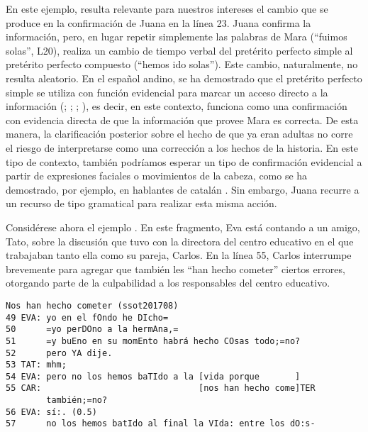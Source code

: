 \documentclass[output=paper]{../langscibook}
\begin{document}
En este ejemplo, resulta relevante para nuestros intereses el cambio que se produce en la confirmación de Juana en la línea 23. Juana confirma la información, pero, en lugar repetir simplemente las palabras de Mara (“fuimos solas”, L20), realiza un cambio de tiempo verbal del pretérito perfecto simple al pretérito perfecto compuesto (“hemos ido solas”). Este cambio, naturalmente, no resulta aleatorio. En el español andino, se ha demostrado que el pretérito perfecto simple se utiliza con función evidencial para marcar un acceso directo a la información (\citealt{Escobar1997};  \citealt{ÁlvarezGarriga2012}; \citealt{PfänderPalacios2013};  \citealt{GarcíaTesoro2017}), es decir, en este contexto, funciona como una confirmación con evidencia directa de que la información que provee Mara es correcta. De esta manera, la clarificación posterior sobre el hecho de que ya eran adultas no corre el riesgo de interpretarse como una corrección a los hechos de la historia. En este tipo de contexto, también podríamos esperar un tipo de confirmación evidencial a partir de expresiones faciales o movimientos de la cabeza, como se ha demostrado, por ejemplo, en hablantes de catalán \citep{RoseanoEtAl2015}. Sin embargo, Juana recurre a un recurso de tipo gramatical para realizar esta misma acción.

Considérese ahora el ejemplo . En este fragmento, Eva está contando a un amigo, Tato, sobre la discusión que tuvo con la directora del centro educativo en el que trabajaban tanto ella como su pareja, Carlos. En la línea 55, Carlos interrumpe brevemente para agregar que también les “han hecho cometer” ciertos errores, otorgando parte de la culpabilidad a los responsables del centro educativo.

\ea\label{ex:satti:14}
\begin{verbatim}
Nos han hecho cometer (ssot201708)
49 EVA: yo en el fOndo he DIcho=
50      =yo perDOno a la hermAna,=
51      =y buEno en su momEnto habrá hecho COsas todo;=no?
52      pero YA dije.
53 TAT: mhm;
54 EVA: pero no los hemos baTIdo a la [vida porque       ]
55 CAR:                               [nos han hecho come]TER   
        también;=no?
56 EVA: sí:. (0.5)
57      no los hemos batIdo al final la VIda: entre los dO:s-
\end{verbatim}
\z
\end{document}
